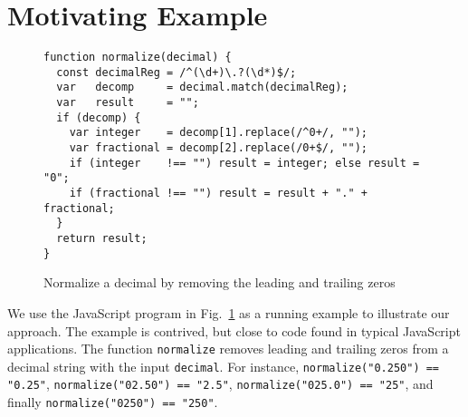 
\section{Motivating Example}\label{sec:mot}

\begin{figure}[tb]
\begin{center}
\begin{verbatim}
function normalize(decimal) {
  const decimalReg = /^(\d+)\.?(\d*)$/;
  var   decomp     = decimal.match(decimalReg);
  var   result     = "";
  if (decomp) {
    var integer    = decomp[1].replace(/^0+/, "");
    var fractional = decomp[2].replace(/0+$/, "");
    if (integer    !== "") result = integer; else result = "0"; 
    if (fractional !== "") result = result + "." + fractional;
  }
  return result;
}
\end{verbatim}
\end{center}
\vspace{-4mm}
\caption{Normalize a decimal by removing the leading and trailing zeros}
\label{fig-run-exmp}
\vspace{-6mm}
\end{figure}

We use the JavaScript program in Fig.~\ref{fig-run-exmp} as a running example to illustrate our approach. The example is
contrived, but close to code found in typical JavaScript
applications.
 The function {\tt normalize}   removes leading and trailing zeros from a decimal string with the input %
{\tt decimal}. For instance, 
 \texttt{normalize("0.250") == "0.25"},
 \texttt{normalize("02.50") == "2.5"},
 \texttt{normalize("025.0") == "25"},
and finally  \texttt{normalize("0250") == "250"}.


